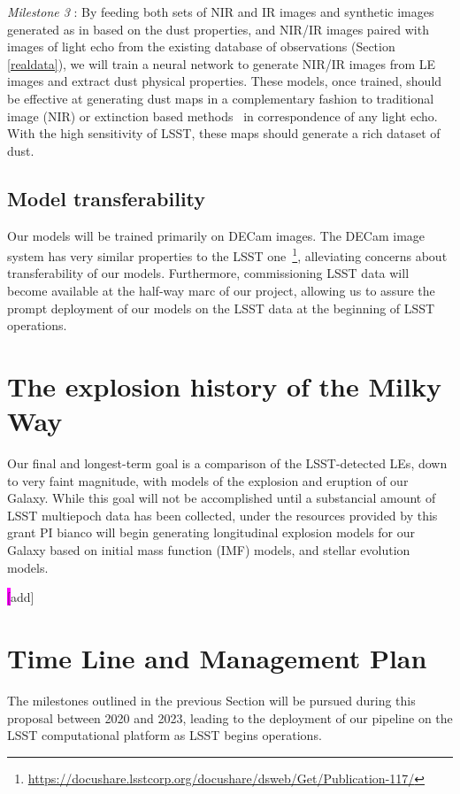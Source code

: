 \documentclass{proposalnsf}
\newcommand{\changeit}[1]{\colorbox{magenta}{#1}}
\begin{document}
\emph{Milestone 3} : By feeding both sets of NIR and IR images and synthetic images generated as in  based on the dust properties, and NIR/IR images paired with images of light echo from the existing database of observations (Section \autoref{realdata}), we will train a neural network to generate NIR/IR images from LE images and extract dust physical properties. These models, once trained, should be effective at generating dust maps in a complementary fashion to traditional image (NIR) or extinction based methods~\citep{schafly11} in correspondence of any light echo. With the high sensitivity of LSST, these maps should generate a rich dataset of dust.

\subsection{Model transferability}
Our models will be trained primarily on DECam images. The DECam image system has very similar properties to the LSST one~\footnote{\url{https://docushare.lsstcorp.org/docushare/dsweb/Get/Publication-117/}}, alleviating concerns about transferability of our models. Furthermore, commissioning LSST data will become available at the half-way marc of our project, allowing us to assure the prompt deployment of our models on the LSST data at the beginning of LSST operations. 

\section{The explosion history of the Milky Way}
Our final and longest-term goal is a comparison of the LSST-detected LEs, down to very faint magnitude, with models of the explosion and eruption of our Galaxy. While this goal will not be accomplished until a substancial amount of LSST multiepoch data has been collected, under the resources provided by this grant PI bianco will begin generating longitudinal explosion models for our Galaxy based on initial mass function (IMF) models, and stellar evolution models. 

\changeit[add]





\section{Time Line and Management Plan}

The milestones outlined in the previous Section will be pursued during this proposal between 2020 and 2023, leading to the deployment of our pipeline on the LSST computational platform as LSST begins operations. 
\end{document}
